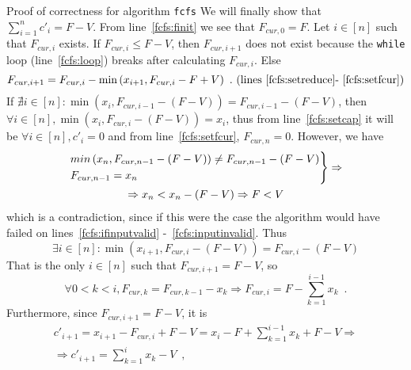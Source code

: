 \begin{sepproof}{Proof of correctness for algorithm \texttt{fcfs}}
  We will finally show that $\sum\limits_{i=1}^{n}c'_i = F - V$. From line~\ref{fcfs:finit} we see that $F_{cur,0} = F$.
  Let $i \in [n]$ such that $F_{cur, i}$ exists. If $F_{cur, i} \leq F - V$, then $F_{cur,i+1}$ does not exist because the
  \texttt{while} loop (line~\ref{fcfs:loop}) breaks after calculating $F_{cur,i}$. Else
  \begin{equation*}
    F_{cur,i+1} = F_{cur,i} - \min{\left(x_{i+1}, F_{cur,i} - F + V\right)} \enspace.
    \mbox{ (lines~\ref{fcfs:setreduce}-~\ref{fcfs:setfcur})}
  \end{equation*}
  If $\nexists i \in [n]: \min{\left(x_i, F_{cur, i-1} - \left(F - V\right)\right)} = F_{cur,i-1} - \left(F - V\right)$,
  then $\forall i \in [n], \min{\left(x_i, F_{cur, i} - \left(F - V\right)\right)} = x_i$, thus from line~\ref{fcfs:setcap}
  it will be $\forall i \in [n], c'_i = 0$ and from line~\ref{fcfs:setfcur}, $F_{cur, n} = 0$. However, we have
  \begin{equation*}
  \begin{gathered}
  \begin{rcases}
    min\left(x_n, F_{cur, n-1} - \left(F - V\right)\right) \neq F_{cur, n-1} - \left(F - V\right) \\
    F_{cur, n-1} = x_n
  \end{rcases} \Rightarrow \\
  \Rightarrow x_n < x_n - \left(F - V\right) \Rightarrow F < V
  \end{gathered}
  \end{equation*}
  which is a contradiction, since if this were the case the algorithm would have failed on lines~\ref{fcfs:ifinputvalid}
  -~\ref{fcfs:inputinvalid}. Thus
  \begin{equation*}
    \exists i \in [n]: \min{\left(x_{i+1}, F_{cur, i} - \left(F - V\right)\right)} = F_{cur,i} - \left(F - V\right)
  \end{equation*}
  That is the only $i \in [n]$ such that $F_{cur,i+1} = F - V$, so
  \begin{equation*}
    \forall 0 < k < i, F_{cur,k} = F_{cur,k-1} - x_k \Rightarrow F_{cur,i} = F - \sum\limits_{k=1}^{i-1}x_k \enspace.
  \end{equation*}
  Furthermore, since $F_{cur,i+1} = F - V$, it is
  \begin{equation*}
  \begin{gathered}
    c'_{i+1} = x_{i+1} - F_{cur,i} + F - V = x_i - F + \sum\limits_{k=1}^{i-1}x_k + F - V \Rightarrow \\
    \Rightarrow c'_{i+1} = \sum\limits_{k=1}^{i}x_k - V \enspace, \\

\end{gathered}
\end{equation*}
\end{sepproof}
